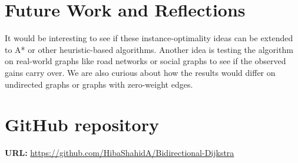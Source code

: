 \documentclass[12pt]{article}
\begin{document}
\section{Future Work and Reflections}
It would be interesting to see if these instance-optimality ideas can be extended to A* or other heuristic-based algorithms. Another idea is testing the algorithm on real-world graphs like road networks or social graphs to see if the observed gains carry over. We are also curious about how the results would differ on undirected graphs or graphs with zero-weight edges.

\section{GitHub repository}
\textbf{URL:} \url{https://github.com/HibaShahidA/Bidirectional-Dijkstra}
\end{document}
